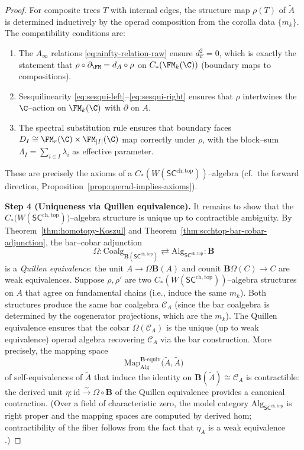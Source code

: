 \begin{proof}
For composite trees $T$ with internal edges, the structure map
$\rho(T)$ of $\widetilde{A}$ is determined inductively by the
operad composition from the corolla data $\{m_k\}$. The
compatibility conditions are:
\begin{enumerate}[label=(\roman*)]
 \item The $A_\infty$ relations \eqref{eq:ainfty-relation-raw}
 ensure $d_{\mathcal{C}}^2 = 0$, which is exactly the
 statement that $\rho \circ \partial_{\FM} = d_A \circ \rho$
 on $C_\ast(\FM_k(\C))$ (boundary maps to compositions).
 \item Sesquilinearity \eqref{eq:sesqui-left}--\eqref{eq:sesqui-right}
 ensures that $\rho$ intertwines the $\C$--action on $\FM_k(\C)$
 with $\partial$ on $A$.
 \item The spectral substitution rule ensures that boundary
 faces $D_I \cong \FM_r(\C) \times \FM_{|I|}(\C)$ map
 correctly under $\rho$, with the block--sum
 $\Lambda_I = \sum_{i \in I} \lambda_i$ as effective parameter.
\end{enumerate}
These are precisely the axioms of a
$C_\ast(W(\mathsf{SC}^{\mathrm{ch,top}}))$--algebra
(cf.\ the forward direction, Proposition~\ref{prop:operad-implies-axioms}).

\medskip
\textbf{Step 4 (Uniqueness via Quillen equivalence).}
It remains to show that the
$C_\ast\!\bigl(W(\mathsf{SC}^{\mathrm{ch,top}})\bigr)$--algebra
structure is unique up to contractible ambiguity. By
Theorem~\ref{thm:homotopy-Koszul} and
Theorem~\ref{thm:scchtop-bar-cobar-adjunction}, the bar--cobar adjunction
\[
 \Omega \colon
 \mathrm{Coalg}_{\mathbf{B}(\mathsf{SC}^{\mathrm{ch,top}})}
 \rightleftarrows
 \mathrm{Alg}_{\mathsf{SC}^{\mathrm{ch,top}}}
 :\! \mathbf{B}
\]
is a \emph{Quillen equivalence}: the unit
$A \to \Omega\mathbf{B}(A)$ and counit
$\mathbf{B}\Omega(C) \to C$ are weak equivalences.
Suppose $\rho, \rho'$ are two
$C_\ast(W(\mathsf{SC}^{\mathrm{ch,top}}))$--algebra structures on
$A$ that agree on fundamental chains (i.e., induce the same $m_k$).
Both structures produce the same bar coalgebra $\mathcal{C}_A$
(since the bar coalgebra is determined by the cogenerator
projections, which are the $m_k$). The Quillen equivalence ensures
that the cobar $\Omega(\mathcal{C}_A)$ is the unique (up to weak
equivalence) operad algebra recovering $\mathcal{C}_A$ via the bar
construction. More precisely, the mapping space
\[
 \mathrm{Map}_{\mathrm{Alg}}^{\mathbf{B}\text{-equiv}}
 \!\bigl(\widetilde{A}, \widetilde{A}\bigr)
\]
of self-equivalences of $\widetilde{A}$ that induce the identity on
$\mathbf{B}(\widetilde{A}) \cong \mathcal{C}_A$ is contractible:
the derived unit $\eta \colon \mathrm{id} \xrightarrow{\sim}
\Omega \circ \mathbf{B}$ of the Quillen equivalence provides a
canonical contraction.
(Over a field of characteristic zero, the model category
$\mathrm{Alg}_{\mathsf{SC}^{\mathrm{ch,top}}}$ is right proper
and the mapping spaces are computed by derived hom; contractibility
of the fiber follows from the fact that $\eta_A$ is a weak
equivalence \cite{Val07, BM03}.)


\end{proof}
